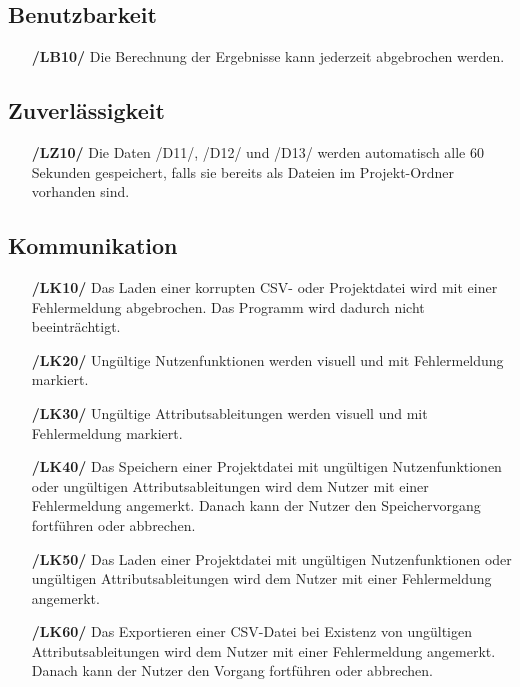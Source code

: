 \documentclass{article}
\begin{document}
\subsection{Benutzbarkeit}
\begin{itemize}
    \item[\textbf{/LB10/}] Die Berechnung der Ergebnisse kann jederzeit abgebrochen werden.
\end{itemize}
\subsection{Zuverlässigkeit}
\begin{itemize}
    \item[\textbf{/LZ10/}] Die Daten /D11/, /D12/ und /D13/ werden automatisch alle 60 Sekunden gespeichert, falls sie bereits als Dateien im Projekt-Ordner vorhanden sind.
\end{itemize}
\subsection{Kommunikation}
\begin{itemize}
    \item[\textbf{/LK10/}] Das Laden einer korrupten CSV- oder Projektdatei wird mit einer Fehlermeldung abgebrochen. Das Programm wird dadurch nicht beeinträchtigt.
    \item[\textbf{/LK20/}] Ungültige Nutzenfunktionen werden visuell und mit Fehlermeldung markiert.
    \item[\textbf{/LK30/}] Ungültige Attributsableitungen werden visuell und mit Fehlermeldung markiert.
    \item[\textbf{/LK40/}] Das Speichern einer Projektdatei mit ungültigen Nutzenfunktionen oder ungültigen Attributsableitungen wird dem Nutzer mit einer Fehlermeldung angemerkt. Danach kann der Nutzer den Speichervorgang fortführen oder abbrechen.
    \item[\textbf{/LK50/}] Das Laden einer Projektdatei mit ungültigen Nutzenfunktionen oder ungültigen Attributsableitungen wird dem Nutzer mit einer Fehlermeldung angemerkt.
    \item[\textbf{/LK60/}] Das Exportieren einer CSV-Datei bei Existenz von ungültigen Attributsableitungen wird dem Nutzer mit einer Fehlermeldung angemerkt. Danach kann der Nutzer den Vorgang fortführen oder abbrechen.
\end{itemize}
\end{document}
